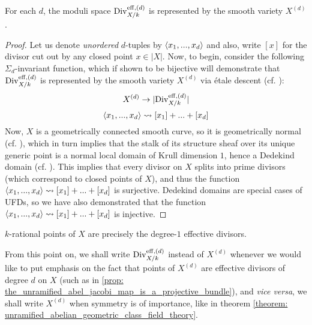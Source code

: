             \begin{proposition} \label{prop: symmetric_powers_of_curves_parametrise_divisors}
                For each $d$, the moduli space $\mathrm{Div}_{X/k}^{\mathrm{eff}, (d)}$ is represented by the smooth variety $X^{(d)}$.
            \end{proposition}
                \begin{proof}
                    Let us denote \textit{unordered} $d$-tuples by $\langle x_1, ..., x_d\rangle$ and also, write $[x]$ for the divisor cut out by any closed point $x \in |X|$. Now, to begin, consider the following $\Sigma_d$-invariant function, which if shown to be bijective will demonstrate that $\mathrm{Div}_{X/k}^{\mathrm{eff}, (d)}$ is represented by the smooth variety $X^{(d)}$ via \'etale descent (cf. \cite[\href{https://stacks.math.columbia.edu/tag/024V}{Tag 024V}]{stacks}):
                        $$X^{(d)} \to |\mathrm{Div}_{X/k}^{\mathrm{eff}, (d)}|$$
                        $$\langle x_1, ..., x_d\rangle \leadsto [x_1] + ... + [x_d]$$
                    Now, $X$ is a geometrically connected smooth curve, so it is geometrically normal (cf. \cite[\href{https://stacks.math.columbia.edu/tag/056T}{Tag 056T}]{stacks}), which in turn implies that the stalk of its structure sheaf over its unique generic point is a normal local domain of Krull dimension $1$, hence a Dedekind domain (cf. \cite[\href{https://stacks.math.columbia.edu/tag/034X}{Tag 034X}]{stacks}). This implies that every divisor on $X$ splits into prime divisors (which correspond to closed points of $X$), and thus the function $\langle x_1, ..., x_d\rangle \leadsto [x_1] + ... + [x_d]$ is surjective. Dedekind domains are special cases of UFDs, so we have also demonstrated that the function $\langle x_1, ..., x_d\rangle \leadsto [x_1] + ... + [x_d]$ is injective.
                \end{proof}
            \begin{corollary}
                $k$-rational points of $X$ are precisely the degree-$1$ effective divisors.
            \end{corollary}
            \begin{convention}
                From this point on, we shall write $\mathrm{Div}_{X/k}^{\mathrm{eff}, (d)}$ instead of $X^{(d)}$ whenever we would like to put emphasis on the fact that points of $X^{(d)}$ are effective divisors of degree $d$ on $X$ (such as in \ref{prop: the_unramified_abel_jacobi_map_is_a_projective_bundle}), and \textit{vice versa}, we shall write $X^{(d)}$ when symmetry is of importance, like in theorem \ref{theorem: unramified_abelian_geometric_class_field_theory}.
            \end{convention}
            
